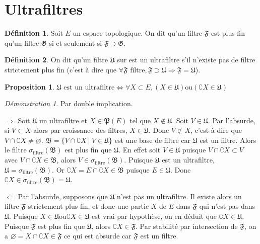 \documentclass[a4paper, 11pt, french]{book}
\newenvironment{itemise}{\itemize}{\enditemize}
\theoremstyle{plain} %
\newtheorem{proposition}{Proposition}
\theoremstyle{definition} %
\newtheorem{definition}{Définition}
\theoremstyle{remark} %
\newtheorem*{demonstration}{Démonstration}
\newcommand{\1}{\mathds{1}}
\newcommand\vide{\varnothing}
\newcommand{\ou}{\mathrel{\mathrm{ou}}}
\renewcommand{\frak}[1]{\mathfrak{#1}}
\renewcommand{\rm}[1]{\mathrm{#1}}
\newcommand\ens[2]{\{#1 \ |\ #2\}}
\newcommand\equivalence[3]{
	\begin{demonstration}
		#1
		\begin{itemise}
			\item[$\Longrightarrow$] #2
			\item[$\Longleftarrow$] #3
		\end{itemise}
	\end{demonstration}
}
\begin{document}
\section{Ultrafiltres}

\begin{definition}
	Soit $E$ un espace topologique.
	On dit qu'un filtre $\frak{F}$ est plus fin qu'un filtre $\frak{G}$ si et seulement si $\frak{F}\supset\frak{G}$.
\end{definition}

\begin{definition}
	On dit qu'un filtre $\frak{U}$ sur est un ultrafiltre s'il n'existe pas de filtre strictement plus fin (c'est à dire que $\forall\frak{F}\text{ filtre}, \frak{F}\supset\frak{U}\Rightarrow\frak{F}=\frak{U}$).
\end{definition}

\begin{proposition}
	$\frak{U}\text{ est un ultrafiltre}\iff\forall X\subset E, (X\in\frak{U})\ou(\complement X\in\frak{U})$
\end{proposition}

\equivalence{Par double implication.}{
	Soit $\frak{U}$ un ultrafiltre et $X\in\frak{P}(E)$ tel que $X\notin\frak{U}$.
		Soit $V\in\frak{U}$.
		Par l'absurde, si $V\subset X$ alors par croissance des filtres, $X\in\frak{U}$.
		Donc $V\not\subset X$, c'est à dire que $V\cap\complement X\neq\vide$.
		$\frak{B}=\ens{V\cap\complement X}{V\in\frak{U}}$ est une base de filtre car $\frak{U}$ est un filtre.
		Alors le filtre $\sigma_\rm{filtre}(\frak{B})$ est plus fin que $\frak{U}$.
		En effet soit $V\in\frak{U}$ puisque $V\cap\complement X\subset V$ avec $V\cap\complement X\in\frak{B}$, alors $V\in\sigma_\rm{filtre}(\frak{B})$.
		Puisque $\frak{U}$ est un ultrafiltre, $\frak{U}=\sigma_\rm{filtre}(\frak{B})$.
		Or $\complement X=E\cap\complement X\in\frak{B}$ puisque $E\in\frak{U}$.
		Donc $\complement X\in\sigma_\rm{filtre}(\frak{B})=\frak{U}$.
}{
	Par l'absurde, supposons que $\frak{U}$ n'est pas un ultrafiltre.
		Il existe alors un filtre $\frak{F}$ strictement plus fin, et donc une partie $X$ de $E$ dans $\frak{F}$ qui n'est pas dans $\frak{U}$.
		Puisque $X\in\frak{U}\ou\complement X\in\frak{U}$ est vrai par hypothèse, on en déduit que $\complement X\in\frak{U}$.
		Puisque $\frak{F}$ est plus fin que $\frak{U}$, alors $\complement X\in\frak{F}$.
		Par stabilité par intersection de $\frak{F}$, on a $\vide=X\cap\complement X\in\frak{F}$ ce qui est absurde car $\frak{F}$ est un filtre.
}
\end{document}
